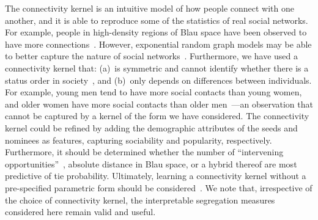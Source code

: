 \documentclass{scrartcl}
\begin{document}
The connectivity kernel is an intuitive model of how people connect with one another, and it is able to reproduce some of the statistics of real social networks. For example, people in high-density regions of Blau space have been observed to have more connections~\cite{Currarini2009}. However, exponential random graph models may be able to better capture the nature of social networks~\cite{Wimmer2010}. Furthermore, we have used a connectivity kernel that: (a)~is symmetric and cannot identify whether there is a status order in society~\cite{Chan2004,Ball2013}, and (b)~only depends on differences between individuals. For example, young men tend to have more social contacts than young women, and older women have more social contacts than older men~\cite{Bhattacharya2016}---an observation that cannot be captured by a kernel of the form we have considered. The connectivity kernel could be refined by adding the demographic attributes of the seeds and nominees as features, capturing sociability and popularity, respectively. Furthermore, it should be determined whether the number of ``intervening opportunities''~\cite{Stouffer1940}, absolute distance in Blau space, or a hybrid thereof are most predictive of tie probability. Ultimately, learning a connectivity kernel without a pre-specified parametric form should be considered~\cite{Frolich2006}. We note that, irrespective of the choice of connectivity kernel, the interpretable segregation measures considered here remain valid and useful.


\end{document}

